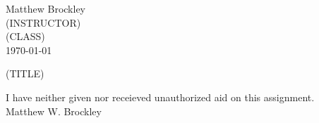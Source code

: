 \documentclass[12pt]{article}
\begin{document}
\begin{flushleft}

Matthew Brockley\\
(INSTRUCTOR)\\
(CLASS)\\
\today \\

\begin{center}
(TITLE)
\end{center}

\setlength{\parindent}{0.5in}



\begin{center}
\singlespacing
I have neither given nor receieved unauthorized aid on this assignment.\\
Matthew W. Brockley
\end{center}


\end{flushleft}
\end{document}
